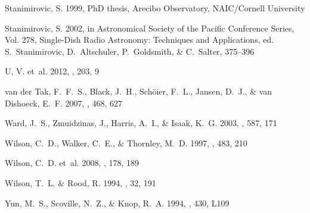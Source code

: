 \begin{thebibliography}{37}
{Stanimirovic}, S. 1999, PhD thesis, Arecibo Observatory, NAIC/Cornell
  University

{Stanimirovic}, S. 2002, in Astronomical Society of the Pacific Conference
  Series, Vol. 278, Single-Dish Radio Astronomy: Techniques and Applications,
  ed. S.~{Stanimirovic}, D.~{Altschuler}, P.~{Goldsmith}, \& C.~{Salter},
  375--396

{U}, V. {et~al.} 2012, \apjs, 203, 9

{van der Tak}, F.~F.~S., {Black}, J.~H., {Sch{\"o}ier}, F.~L., {Jansen}, D.~J.,
  \& {van Dishoeck}, E.~F. 2007, \aap, 468, 627

{Ward}, J.~S., {Zmuidzinas}, J., {Harris}, A.~I., \& {Isaak}, K.~G. 2003, \apj,
  587, 171

{Wilson}, C.~D., {Walker}, C.~E., \& {Thornley}, M.~D. 1997, \apj, 483, 210

{Wilson}, C.~D. {et~al.} 2008, \apjs, 178, 189

{Wilson}, T.~L. \& {Rood}, R. 1994, \araa, 32, 191

{Yun}, M.~S., {Scoville}, N.~Z., \& {Knop}, R.~A. 1994, \apjl, 430, L109

\end{thebibliography}

%